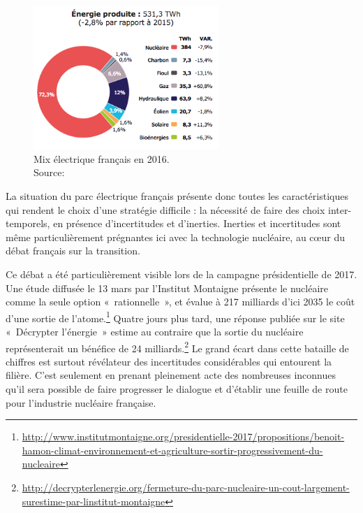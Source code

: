 \begin{figure}[!ht]
	\centering
	\includegraphics[width=7cm]{figures/RTE_Mix.png}
	\caption[Mix électrique français en 2016]{Mix électrique français en 2016.\\Source: \citet[p. 4]{RTE2016}}
\end{figure}

La situation du parc électrique français présente donc toutes les caractéristiques qui rendent le choix d’une stratégie difficile : la nécessité de faire des choix inter-temporels, en présence d’incertitudes et d’inerties. Inerties et incertitudes sont même particulièrement prégnantes ici avec la technologie nucléaire, au cœur du débat français sur la transition. 

Ce débat a été particulièrement visible lors de la campagne présidentielle de 2017. Une étude diffusée le 13 mars par l’Institut Montaigne présente le nucléaire comme la seule option «~rationnelle~», et évalue à 217 milliards d’ici 2035 le coût d’une sortie de l’atome.\footnote{\url{http://www.institutmontaigne.org/presidentielle-2017/propositions/benoit-hamon-climat-environnement-et-agriculture-sortir-progressivement-du-nucleaire}} Quatre jours plus tard, une réponse publiée sur le site «~Décrypter l’énergie~» estime au contraire que la sortie du nucléaire représenterait un bénéfice de 24 milliards.\footnote{\url{http://decrypterlenergie.org/fermeture-du-parc-nucleaire-un-cout-largement-surestime-par-linstitut-montaigne}} Le grand écart dans cette bataille de chiffres est surtout révélateur des incertitudes considérables qui entourent la filière. C’est seulement en prenant pleinement acte des nombreuses inconnues qu’il sera possible de faire progresser le dialogue et d’établir une feuille de route pour l’industrie nucléaire française.

